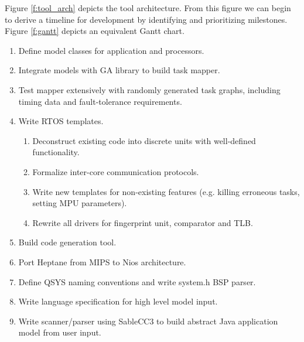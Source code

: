 \documentclass{article}
\begin{document}
Figure \ref{f:tool_arch} depicts the tool architecture. From this figure we can begin to derive a timeline for development by identifying and prioritizing milestones. Figure \ref{f:gantt} depicts an equivalent Gantt chart.

\begin{enumerate}
\item Define model classes for application and processors.
\item Integrate models with GA library to build task mapper.
\item Test mapper extensively with randomly generated task graphs, including timing data and fault-tolerance requirements.
\item Write RTOS templates.
  \begin{enumerate}
  \item Deconstruct existing code into discrete units with well-defined functionality.
  \item Formalize inter-core communication protocols.
  \item Write new templates for non-existing features (e.g. killing erroneous tasks, setting MPU parameters).
  \item Rewrite all drivers for fingerprint unit, comparator and TLB.
  \end{enumerate}
\item Build code generation tool.
\item Port Heptane from MIPS to Nios architecture.
\item Define QSYS naming conventions and write system.h BSP parser.
\item Write language specification for high level model input.
\item Write scanner/parser using SableCC3 to build abstract Java application model from user input. 
\end{enumerate}




\end{document}

